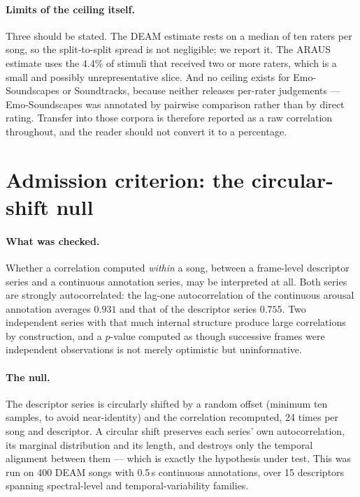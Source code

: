 \paragraph{Limits of the ceiling itself.}
Three should be stated. The DEAM estimate rests on a median of ten raters per song, so
the split-to-split spread is not negligible; we report it. The ARAUS estimate uses the
4.4\% of stimuli that received two or more raters, which is a small and possibly
unrepresentative slice. And no ceiling exists for Emo-Soundscapes or Soundtracks,
because neither releases per-rater judgements --- Emo-Soundscapes was annotated by
pairwise comparison rather than by direct rating. Transfer into those corpora is
therefore reported as a raw correlation throughout, and the reader should not convert
it to a percentage.

\section{Admission criterion: the circular-shift null}

\paragraph{What was checked.}
Whether a correlation computed \emph{within} a song, between a frame-level descriptor
series and a continuous annotation series, may be interpreted at all. Both series are
strongly autocorrelated: the lag-one autocorrelation of the continuous arousal
annotation averages $0.931$ and that of the descriptor series $0.755$. Two independent
series with that much internal structure produce large correlations by construction,
and a $p$-value computed as though successive frames were independent observations is
not merely optimistic but uninformative.

\paragraph{The null.}
The descriptor series is circularly shifted by a random offset (minimum ten samples,
to avoid near-identity) and the correlation recomputed, 24 times per song and
descriptor. A circular shift preserves each series' own autocorrelation, its marginal
distribution and its length, and destroys only the temporal alignment between them ---
which is exactly the hypothesis under test. This was run on 400 DEAM songs with
0.5\,s continuous annotations, over 15 descriptors spanning spectral-level and
temporal-variability families.

